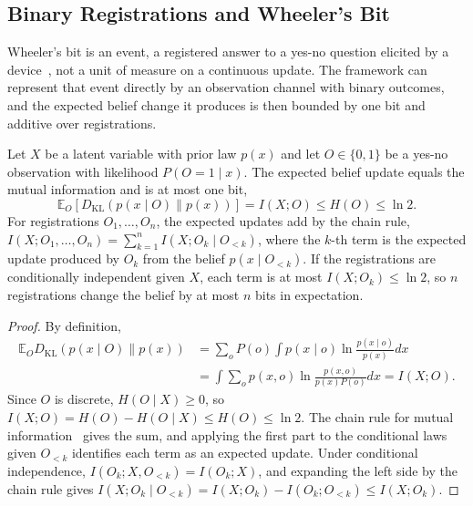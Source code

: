 \subsection{Binary Registrations and Wheeler's Bit}
\label{sec:binary_registration}

Wheeler's bit is an event, a registered answer to a yes-no question elicited by a device~\cite{Wheeler1990}, not a unit of measure on a continuous update. The framework can represent that event directly by an observation channel with binary outcomes, and the expected belief change it produces is then bounded by one bit and additive over registrations.

\begin{proposition}\label{prop:binary_registration}
Let $X$ be a latent variable with prior law $p(x)$ and let $O \in \{0,1\}$ be a yes-no observation with likelihood $P(O=1 \mid x)$. The expected belief update equals the mutual information and is at most one bit,
\begin{equation}
\mathbb{E}_{O}\left[D_{\mathrm{KL}}\left(p(x \mid O) \| p(x)\right)\right] = I(X;O) \le H(O) \le \ln 2 .
\label{eq:registration_bound}
\end{equation}
For registrations $O_1, \ldots, O_n$, the expected updates add by the chain rule, $I(X; O_1, \ldots, O_n) = \sum_{k=1}^n I(X; O_k \mid O_{<k})$, where the $k$-th term is the expected update produced by $O_k$ from the belief $p(x \mid O_{<k})$. If the registrations are conditionally independent given $X$, each term is at most $I(X;O_k) \le \ln 2$, so $n$ registrations change the belief by at most $n$ bits in expectation.
\end{proposition}
\begin{proof}
By definition,
\begin{align*}
\mathbb{E}_O D_{\mathrm{KL}}(p(x\mid O)\|p(x)) &= \sum_o P(o)\int p(x\mid o)\ln\frac{p(x\mid o)}{p(x)}dx \\
&= \int\sum_o p(x,o)\ln\frac{p(x,o)}{p(x)P(o)}dx = I(X;O).
\end{align*}
Since $O$ is discrete, $H(O \mid X) \ge 0$, so $I(X;O) = H(O) - H(O\mid X) \le H(O) \le \ln 2$. The chain rule for mutual information~\cite[Thm.~2.5.2]{CoverThomas2006} gives the sum, and applying the first part to the conditional laws given $O_{<k}$ identifies each term as an expected update. Under conditional independence, $I(O_k; X, O_{<k}) = I(O_k; X)$, and expanding the left side by the chain rule gives $I(X;O_k \mid O_{<k}) = I(X;O_k) - I(O_k;O_{<k}) \le I(X;O_k)$.
\end{proof}

